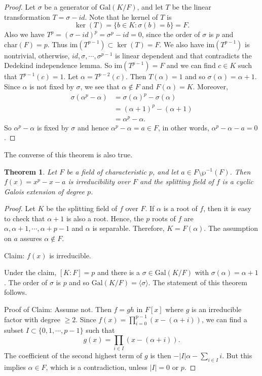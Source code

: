 \documentclass[12pt]{report}
\newtheorem{theorem}{Theorem}[section]
\theoremstyle{definition}
\newcommand{\charr}{\text{char}}
\newcommand{\Gal}{\text{Gal}}
\newcommand{\im}{\text{im}}
\begin{document}
\begin{proof}
	Let $\sigma$ be a generator of $\Gal(K/F)$, and let $T$ be the linear transformation $T=\sigma-id$. Note that he kernel of $T$ is $$\ker(T)=\{b\in K: \sigma(b)=b\}=F.$$ Also we have $T^p=(\sigma-id)^p=\sigma^p-id=0$, since the order of $\sigma$ is $p$ and $\charr(F)=p$. Thus $\im(T^{p-1})\subset \ker(T)=F$. We also have $\im(T^{p-1})$ is nontrivial, otherwise, $id,\sigma,\cdots,\sigma^{p-1}$ is linear dependent and that contradicts the Dedekind independence lemma. So $\im(T^{p-1})=F$ and we can find $c\in K$ such that $T^{p-1}(c)=1$. Let $\alpha=T^{p-2}(c)$. Then $T(\alpha)=1$ and so $\sigma(\alpha)=\alpha+1$. Since $\alpha$ is not fixed by $\sigma$, we see that $\alpha\notin F$ and $F(\alpha)=K$. Moreover, \begin{align*}
		\sigma(\alpha^p -\alpha) & =\sigma(\alpha)^p-\sigma(\alpha) \\
		                         & = (\alpha+1)^p-(\alpha+1)        \\
		                         & =\alpha^p-\alpha.
	\end{align*}
	So $\alpha^p-\alpha$ is fixed by $\sigma$ and hence $\alpha^p-\alpha=a\in F$, in other words, $\alpha^p-\alpha-a=0$.
\end{proof}

The converse of this theorem is also true.

\begin{theorem}\label{as1}
	Let $F$ be a field of characteristic $p$, and let $a\in F\setminus\wp^{-1}(F)$. Then $f(x)=x^p-x-a$ is irreducibility over $F$ and the splitting field of $f$ is a cyclic Galois extension of degree $p$.
\end{theorem}

\begin{proof}
	Let $K$ be the splitting field of $f$ over $F$. If $\alpha$ is a root of $f$, then it is easy to check that $\alpha+1$ is also a root. Hence, the $p$ roots of $f$ are $\alpha,\alpha+1,\cdots,\alpha+p-1$ and $\alpha$ is separable. Therefore, $K=F(\alpha)$. The assumption on $a$ assures $\alpha\notin F$.

	Claim: $f(x)$ is irreducible.

	Under the claim, $[K:F]=p$ and there is a $\sigma\in \Gal(K/F)$ with $\sigma(\alpha)=\alpha+1$. The order of $\sigma$ is $p$ and so $\Gal(K/F)=\langle \sigma\rangle$. The statement of this theorem follows.

	Proof of Claim: Assume not. Then $f=gh$ in $F[x]$ where $g$ is an irreducible factor with degree $\geq 2$. Since $f(x)=\prod_{i=0}^{p-1}(x-(\alpha+i))$, we can find a subset $I\subset\{0,1,\cdots,p-1\}$ such that $$g(x)=\prod_{i\in I}(x-(\alpha+i)).$$ The coefficient of the second highest term of $g$ is then $-|I|\alpha-\sum_{i\in I}i$. But this implies $\alpha\in F$, which is a contradiction, unless $|I|=0$ or $p$.
\end{proof}
\end{document}
